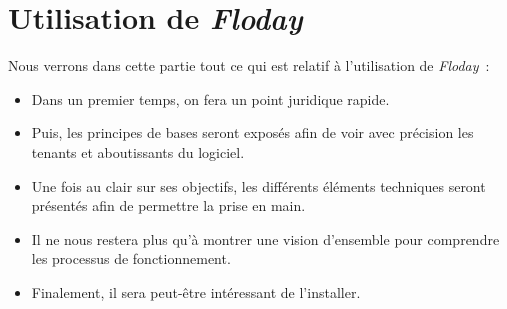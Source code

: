 \section{Utilisation de \emph{Floday}}

\begin{intro}
	Nous verrons dans cette partie tout ce qui est relatif à l'utilisation de \emph{Floday}~:
	\begin{itemize}
		\item Dans un premier temps, on fera un point juridique rapide.
		\item Puis, les principes de bases seront exposés afin de voir avec précision les tenants et aboutissants du logiciel.
		\item Une fois au clair sur ses objectifs, les différents éléments techniques seront présentés afin de permettre la prise en main.
		\item Il ne nous restera plus qu'à montrer une vision d'ensemble pour comprendre les processus de fonctionnement.
		\item Finalement, il sera peut-être intéressant de l'installer.
	\end{itemize}
\end{intro}








